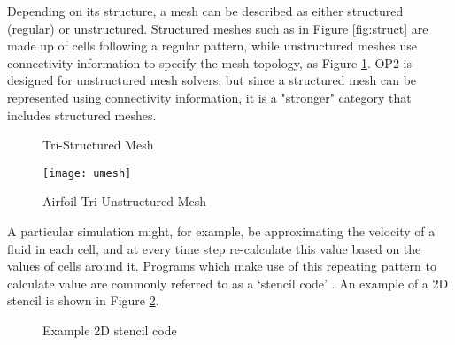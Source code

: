 \clearpage
Depending on its structure, a mesh can be described as either structured (regular) or unstructured. Structured meshes such as in Figure \ref{fig:struct} are made up of cells following a regular pattern, while unstructured meshes use connectivity information to specify the mesh topology, as Figure \ref{fig:umesh}. OP2 is designed for unstructured mesh solvers, but since a structured mesh can be represented using connectivity information, it is a "stronger" category that includes structured meshes.
\vspace{.5cm}
\begin{figure}[h!]
  \begin{minipage}{.5\textwidth}
    \centering
    \caption{Tri-Structured Mesh}
    \label{fig:struct}
  \end{minipage}
  \begin{minipage}{.5\textwidth}
    \centering
    \texttt{[image: umesh]}
    \caption{Airfoil Tri-Unstructured Mesh}
    \label{fig:umesh}
  \end{minipage}
\end{figure}
\par
A particular simulation might, for example, be approximating the velocity of a fluid in each cell, and at every time step re-calculate this value based on the values of cells around it. Programs which make use of this repeating pattern to calculate value are commonly referred to as a `stencil code' \cite{stencil}. An example of a 2D stencil is shown in Figure \ref{fig:stencil}.
\vspace{.5cm}
\begin{figure}[h!]
  \centering
{}
\caption{Example 2D stencil code}
\label{fig:stencil}
\end{figure}

